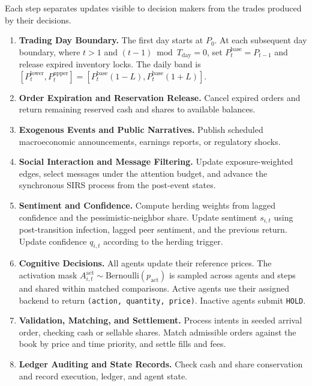 Each step separates updates visible to decision makers from the trades produced by their decisions.
\begin{enumerate}[leftmargin=*, label=(\arabic*), ref=\arabic*]
  \item\label{phase:boundary} \textbf{Trading Day Boundary.} The first day starts at $P_0$. At each subsequent day boundary, where $t>1$ and $(t-1)\bmod T_{\mathrm{day}}=0$, set $P^{\mathrm{base}}_t=P_{t-1}$ and release expired inventory locks. The daily band is $[P_t^{\mathrm{lower}},P_t^{\mathrm{upper}}]=[P^{\mathrm{base}}_t(1-L),P^{\mathrm{base}}_t(1+L)]$.
  \item\label{phase:expiry} \textbf{Order Expiration and Reservation Release.} Cancel expired orders and return remaining reserved cash and shares to available balances.
  \item\label{phase:events} \textbf{Exogenous Events and Public Narratives.} Publish scheduled macroeconomic announcements, earnings reports, or regulatory shocks.
  \item\label{phase:social} \textbf{Social Interaction and Message Filtering.} Update exposure-weighted edges, select messages under the attention budget, and advance the synchronous SIRS process from the post-event states.
  \item\label{phase:behavior} \textbf{Sentiment and Confidence.} Compute herding weights from lagged confidence and the pessimistic-neighbor share. Update sentiment $s_{i,t}$ using post-transition infection, lagged peer sentiment, and the previous return. Update confidence $q_{i,t}$ according to the herding trigger.
  \item\label{phase:decision} \textbf{Cognitive Decisions.} All agents update their reference prices. The activation mask $A^{\mathrm{act}}_{i,t}\sim\mathrm{Bernoulli}(p_{\mathrm{act}})$ is sampled across agents and steps and shared within matched comparisons. Active agents use their assigned backend to return \texttt{(action, quantity, price)}. Inactive agents submit \texttt{HOLD}.
  \item\label{phase:execution} \textbf{Validation, Matching, and Settlement.} Process intents in seeded arrival order, checking cash or sellable shares. Match admissible orders against the book by price and time priority, and settle fills and fees.
  \item\label{phase:commit} \textbf{Ledger Auditing and State Records.} Check cash and share conservation and record execution, ledger, and agent state.
\end{enumerate}

